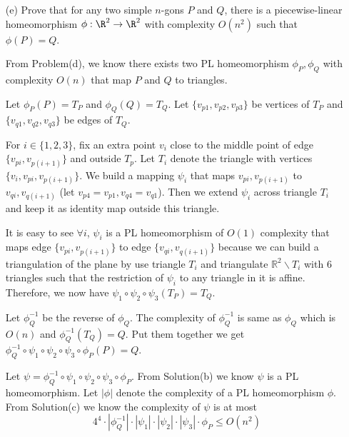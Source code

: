 \documentclass[11pt]{article}
\begin{document}
\begin{enumerate}[(a)]
  \item[(e)]
    Prove that for any two simple \(n\)-gons \(P\) and \(Q\), there is a piecewise-linear
    homeomorphism \(\phi : \R^2 \to \R^2\) with complexity \(O(n^2)\) such that \(\phi(P) = Q\).

\begin{solution}
  From Problem(d), we know there exists two PL homeomorphism \(\phi_P,\phi_Q\) with complexity \(O(n)\) that map \(P\) and \(Q\) to triangles.

  Let \(\phi_P(P)=T_P\) and \(\phi_Q(Q)=T_Q\). Let \(\{v_{p1},v_{p2},v_{p3}\}\) be vertices of \(T_P\) and \(\{v_{q1},v_{q2},v_{q3}\}\) be edges of \(T_Q\).

  For \(i\in\{1,2,3\}\), fix an extra point \(v_i\) close to the middle point of edge \(\{v_{pi},v_{p(i+1)}\}\) and outside \(T_p\). Let \(T_i\) denote the triangle with vertices \(\{v_i,v_{pi},v_{p(i+1)}\}\). We build a mapping \(\psi_i\) that maps \(v_{pi},v_{p(i+1)}\) to \(v_{qi},v_{q(i+1)}\) (let \(v_{p4}=v_{p1}, v_{q4}=v_{q1}\)).
  Then we extend \(\psi_i\) across triangle \(T_i\) and keep it as identity map outside this triangle.

  It is easy to see \(\forall i\), \(\psi_i\) is a PL homeomorphism of \(O(1)\) complexity that maps edge \(\{v_{pi},v_{p(i+1)}\}\) to edge \(\{v_{qi},v_{q(i+1)}\}\) because we can build a triangulation of the plane by use triangle \(T_i\) and triangulate \(\mathbb{R}^2\backslash T_i\) with \(6\) triangles such that the restriction of \(\psi_i\) to any triangle in it is affine.
  Therefore, we now have \(\psi_1\circ\psi_2\circ \psi_3(T_P)=T_Q\).

  Let \(\phi^{-1}_Q\) be the reverse of \(\phi_Q\). The complexity of \(\phi^{-1}_Q\) is same as \(\phi_Q\) which is \(O(n)\) and \(\phi^{-1}_Q(T_Q)=Q\).
  Put them together we get \(\phi^{-1}_Q\circ\psi_1\circ\psi_2\circ\psi_3\circ\phi_P(P)=Q\).

  Let \(\psi=\phi^{-1}_Q\circ\psi_1\circ\psi_2\circ\psi_3\circ\phi_P\).
  From Solution(b) we know \(\psi\) is a PL homeomorphism.
  Let \(|\phi|\) denote the complexity of a PL homeomorphism \(\phi\).
  From Solution(c) we know the complexity of \(\psi\) is at most
  \[4^4\cdot|\phi^{-1}_Q|\cdot|\psi_1|\cdot|\psi_2|\cdot|\psi_3|\cdot\phi_P\le O(n^2)\]


\end{solution}
\end{enumerate}
\end{document}
